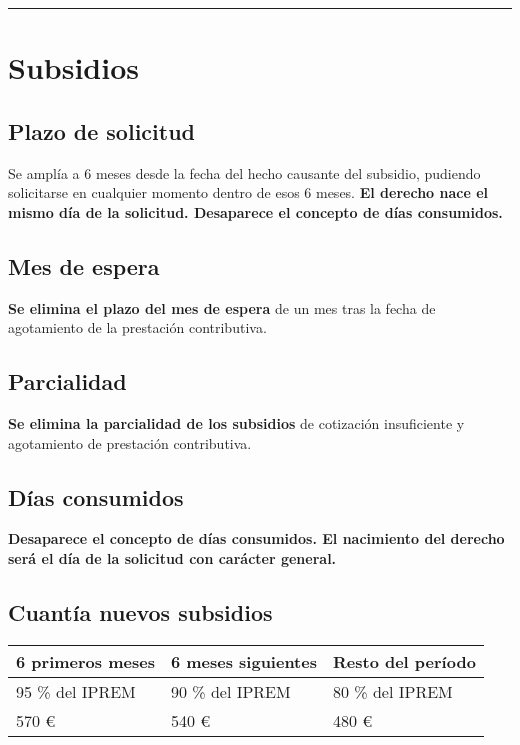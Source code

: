 \documentclass{article}
\begin{document}
	\bigskip
	
	\hrule
	
	\section*{Subsidios}
	
	\subsection*{Plazo de solicitud}
	
	Se amplía a 6 meses desde la fecha del hecho causante del subsidio, pudiendo solicitarse en cualquier momento dentro de esos 6 meses. \textbf{El derecho nace el mismo día de la solicitud. Desaparece el concepto de días consumidos.}
	
	\subsection*{Mes de espera}
	
	\textbf{Se elimina el plazo del mes de espera} de un mes tras la fecha de agotamiento de la prestación contributiva.
	
	\subsection*{Parcialidad}
	
	\textbf{Se elimina la parcialidad de los subsidios} de cotización insuficiente y agotamiento de prestación contributiva.
	
	\subsection*{Días consumidos}
	
	\textbf{Desaparece el concepto de días consumidos. El nacimiento del derecho será el día de la solicitud con carácter general.}
	
	\subsection*{Cuantía nuevos subsidios}
	
	\begin{tabular}{|l|l|l|}
		\hline
		6 primeros meses & 6 meses siguientes & Resto del período \\
		\hline
		95 \% del IPREM & 90 \% del IPREM & 80 \% del IPREM \\
		\hline
		570 € & 540 € & 480 € \\
		\hline
	\end{tabular}
	
\end{document}
